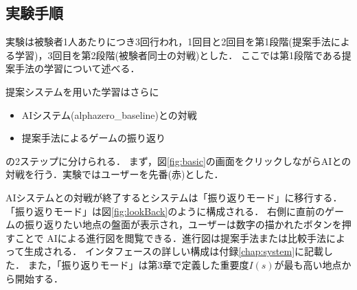 \subsection{実験手順}
実験は被験者1人あたりにつき3回行われ，1回目と2回目を第1段階(提案手法による学習)，3回目を第2段階(被験者同士の対戦)とした．
ここでは第1段階である提案手法の学習について述べる．

提案システムを用いた学習はさらに
\begin{itemize}
	\item AIシステム(alphazero\_baseline)との対戦
	\item 提案手法によるゲームの振り返り
\end{itemize}
の2ステップに分けられる．
まず，図\ref{fig:basic}の画面をクリックしながらAIとの対戦を行う．実験ではユーザーを先番(赤)とした．


AIシステムとの対戦が終了するとシステムは「振り返りモード」に移行する．
「振り返りモード」は図\ref{fig:lookBack}のように構成される．
右側に直前のゲームの振り返りたい地点の盤面が表示され，ユーザーは数字の描かれたボタンを押すことで
AIによる進行図を閲覧できる．進行図は提案手法または比較手法によって生成される．
インタフェースの詳しい構成は付録\ref{chap:system}に記載した．
また，「振り返りモード」は第3章で定義した重要度$I(s)$が最も高い地点から開始する．

